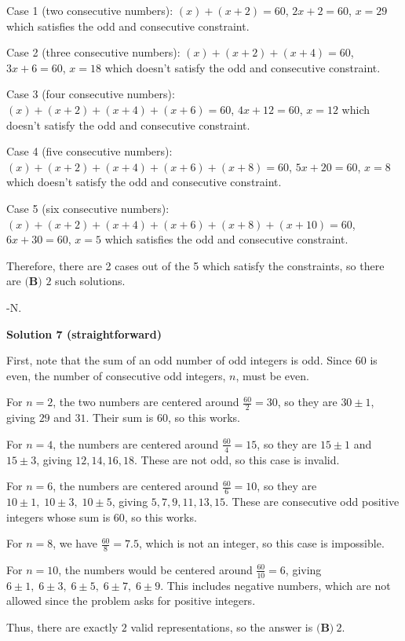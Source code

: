 \begin{enumerate}
 Case 1 (two consecutive numbers): $(x) + (x + 2) = 60$, $2x+2 = 60$, $x=29$ which satisfies the odd and consecutive constraint.

 Case 2 (three consecutive numbers): $(x) + (x + 2) + (x + 4) = 60$, $3x+6 = 60$, $x=18$ which doesn't satisfy the odd and consecutive constraint.

 Case 3 (four consecutive numbers): $(x) + (x + 2) + (x + 4) + (x + 6) = 60$, $4x+12 = 60$, $x=12$ which doesn't satisfy the odd and consecutive constraint.

 Case 4 (five consecutive numbers): $(x) + (x + 2) + (x + 4) + (x + 6) + (x + 8) = 60$, $5x+20 = 60$, $x=8$ which doesn't satisfy the odd and consecutive constraint.

 Case 5 (six consecutive numbers): $(x) + (x + 2) + (x + 4) + (x + 6) + (x + 8) + (x + 10) = 60$, $6x+30 = 60$, $x=5$ which satisfies the odd and consecutive constraint.

 Therefore, there are 2 cases out of the 5 which satisfy the constraints, so there are $\boxed{\textbf{(B) }2}$ such solutions.

 -N.

 



\textbf{Solution 7 (straightforward)}

First, note that the sum of an odd number of odd integers is odd. Since $60$ is even, the number of consecutive odd integers, $n$, must be even.

 For $n=2$, the two numbers are centered around $\frac{60}{2}=30$, so they are $30\pm1$, giving $29$ and $31$. Their sum is $60$, so this works.

 For $n=4$, the numbers are centered around $\frac{60}{4}=15$, so they are $15\pm1$ and $15\pm3$, giving $12,14,16,18$. These are not odd, so this case is invalid.

 For $n=6$, the numbers are centered around $\frac{60}{6}=10$, so they are $10\pm1,\;10\pm3,\;10\pm5$, giving $5,7,9,11,13,15$. These are consecutive odd positive integers whose sum is $60$, so this works.

 For $n=8$, we have $\frac{60}{8}=7.5$, which is not an integer, so this case is impossible.

 For $n=10$, the numbers would be centered around $\frac{60}{10}=6$, giving $6\pm1,\;6\pm3,\;6\pm5,\;6\pm7,\;6\pm9$. This includes negative numbers, which are not allowed since the problem asks for positive integers.

 Thus, there are exactly $2$ valid representations, so the answer is $\boxed{\textbf{(B)}\ 2}$.


\end{enumerate}
